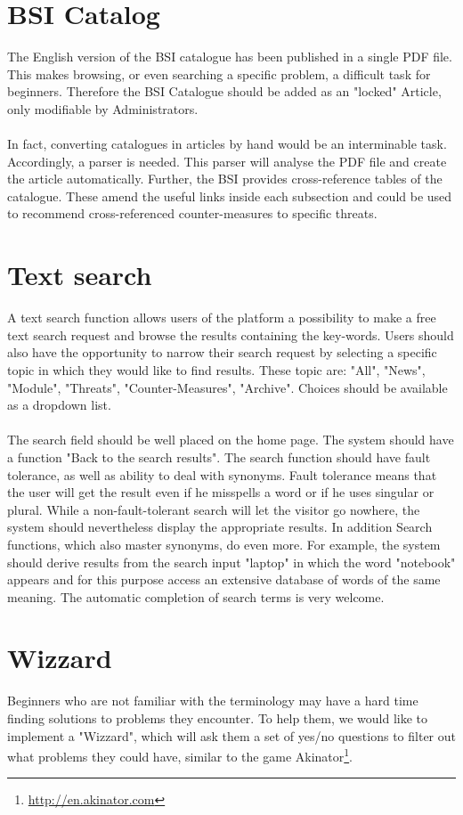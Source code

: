\section{BSI Catalog}
The English version of the BSI catalogue has been published in a single PDF file. This makes browsing, or even searching a specific problem, a difficult task for beginners. Therefore the BSI Catalogue should be added as an "locked" Article, only modifiable by Administrators.
\\\\
In fact, converting catalogues in articles by hand would be an interminable task. Accordingly, a parser is needed. This parser will analyse the PDF file and create the article automatically. Further, the BSI provides cross-reference tables of the catalogue. These amend the useful links inside each subsection and could be used to recommend cross-referenced counter-measures to specific threats.

\section{Text search}
\label{search_function}
A text search function allows users of the platform a possibility to make a free text search request and browse the results containing the key-words. Users should also have the opportunity to narrow their search request by selecting a specific topic in which they would like to find results. These topic are: "All", "News", "Module", "Threats", "Counter-Measures", "Archive". Choices should be available as a dropdown list.
\\\\
The search field should be well placed on the home page. The system should have a function "Back to the search results". The search function should have fault tolerance, as well as ability to deal with synonyms. Fault tolerance means that the user will get the result even if he misspells a word or if he uses singular or plural. While a non-fault-tolerant search will let the visitor go nowhere, the system should nevertheless display the appropriate results.
In addition Search functions, which also master synonyms, do even more. For example, the system should derive results from the search input "laptop" in which the word "notebook" appears and for this purpose access an extensive database of words of the same meaning. The automatic completion of search terms is very welcome.

\section{Wizzard}
\label{wizard}
Beginners who are not familiar with the terminology may have a hard time finding solutions to problems they encounter. To help them, we would like to implement a "Wizzard", which will ask them a set of yes/no questions to filter out what problems they could have, similar to the game Akinator\footnote{\url{http://en.akinator.com}}. 

